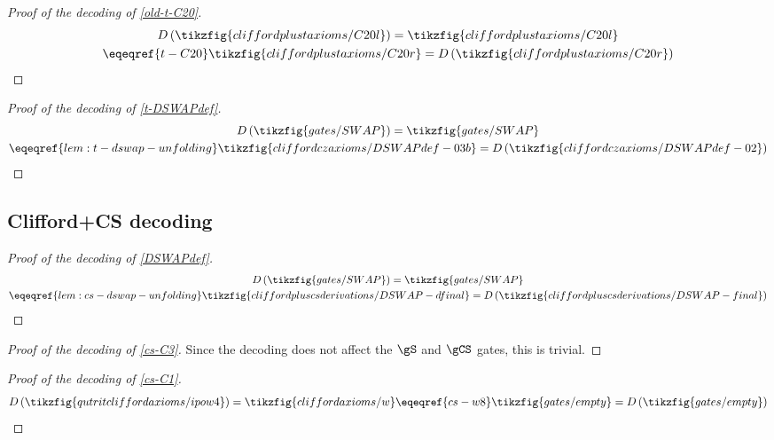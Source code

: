 \begin{proof}[Proof of the decoding of \cref{old-t-C20}]
    \begin{gather*}
        D\left(\tikzfig{cliffordplustaxioms/C20l}\right)
        = \tikzfig{cliffordplustaxioms/C20l}\\
        \eqeqref{t-C20} \tikzfig{cliffordplustaxioms/C20r}
        = D\left(\tikzfig{cliffordplustaxioms/C20r}\right)
    \end{gather*}
\end{proof}

\begin{proof}[Proof of the decoding of \cref{t-DSWAPdef}]
    \begin{gather*}
        D\left(\tikzfig{gates/SWAP}\right)
        = \tikzfig{gates/SWAP}\\
        \eqeqref{lem:t-dswap-unfolding} \tikzfig{cliffordczaxioms/DSWAPdef-03b}
        = D\left(\tikzfig{cliffordczaxioms/DSWAPdef-02}\right)
    \end{gather*}
\end{proof}



\subsection{Clifford+CS decoding}
\begin{proof}[Proof of the decoding of \cref{DSWAPdef}]
    \begin{gather*}
        D\left(\tikzfig{gates/SWAP}\right)
        = \tikzfig{gates/SWAP}\\
        \eqeqref{lem:cs-dswap-unfolding} \tikzfig{cliffordpluscsderivations/DSWAP-dfinal}
        = D\left(\tikzfig{cliffordpluscsderivations/DSWAP-final}\right)
    \end{gather*}
\end{proof}

\begin{proof}[Proof of the decoding of \cref{cs-C3}]
    Since the decoding does not affect the $\gS$ and $\gCS$ gates, this is trivial.
\end{proof}

\begin{proof}[Proof of the decoding of \cref{cs-C1}]
    \begin{gather*}
        D\left(\tikzfig{qutritcliffordaxioms/ipow4}\right)
        = \tikzfig{cliffordaxioms/w}
        \eqeqref{cs-w8} \tikzfig{gates/empty}
        = D\left(\tikzfig{gates/empty}\right)
    \end{gather*}
\end{proof}

